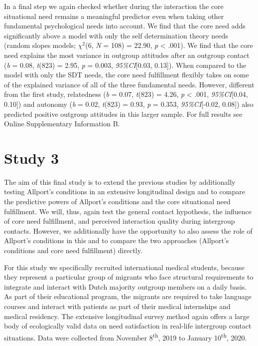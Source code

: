 In a final step we again checked whether during the interaction the core
situational need remains a meaningful predictor even when taking other
fundamental psychological needs into account. We find that the core need
adds significantly above a model with only the self determination theory
needs (random slopes models; \(\chi^2\)(6, \textit{N} = 108) = 22.90,
\textit{p} \textless{} .001). We find that the core need explains the
most variance in outgroup attitudes after an outgroup contact
(\textit{b} = 0.08, \textit{t}(823) = 2.95, \textit{p} = 0.003,
\textit{95\%CI}{[}0.03, 0.13{]}). When compared to the model with only
the SDT needs, the core need fulfillment flexibly takes on some of the
explained variance of all of the three fundamental needs. However,
different from the first study, relatedness (\textit{b} = 0.07,
\textit{t}(823) = 4.26, \textit{p} \textless{} .001,
\textit{95\%CI}{[}0.04, 0.10{]}) and autonomy (\textit{b} = 0.02,
\textit{t}(823) = 0.93, \textit{p} = 0.353, \textit{95\%CI}{[}-0.02,
0.08{]}) also predicted positive outgroup attitudes in this larger
sample. For full results see Online Supplementary Information B.

\section{Study 3}

The aim of this final study is to extend the previous studies by
additionally testing Allport's conditions in an extensive longitudinal
design and to compare the predictive powers of Allport's conditions and
the core situational need fulfillment. We will, thus, again test the
general contact hypothesis, the influence of core need fulfillment, and
perceived interaction quality during intergroup contacts. However, we
additionally have the opportunity to also assess the role of Allport's
conditions in this and to compare the two approaches (Allport's
conditions and core need fulfillment) directly.

For this study we specifically recruited international medical students,
because they represent a particular group of migrants who face
structural requirements to integrate and interact with Dutch majority
outgroup members on a daily basis. As part of their educational program,
the migrants are required to take language courses and interact with
patients as part of their medical internships and medical residency. The
extensive longitudinal survey method again offers a large body of
ecologically valid data on need satisfaction in real-life intergroup
contact situations. Data were collected from November
8\textsuperscript{th}, 2019 to January 10\textsuperscript{th}, 2020.

